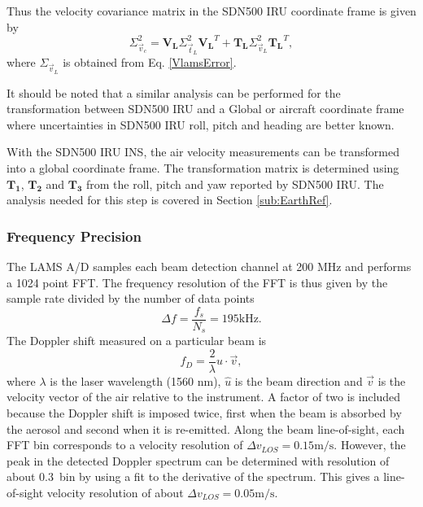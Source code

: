 \documentclass[12pt,twoside,english]{article}\usepackage[]{graphicx}\usepackage[]{color}
\begin{document}
{{Thus the velocity covariance matrix in the SDN500 IRU coordinate frame is given by  
\begin{equation}
\Sigma_{\vec{v}_{c}}^{2}=\mathbf{V_{L}}\Sigma_{\vec{t}_{L}}^{2}\mathbf{V_{L}}^{T}+\mathbf{T_{L}}\Sigma_{\vec{v}_{L}}^{2}\mathbf{T_{L}}^{T},\label{CMvelError} 
\end{equation}
where $\Sigma_{\vec{v}_{L}}$ is obtained from Eq. \eqref{VlamsError}. 

It should be noted that a similar analysis can be performed for the transformation between SDN500 IRU and a Global or aircraft coordinate frame where uncertainties in SDN500 IRU roll, pitch and heading are better known. 


With the SDN500 IRU INS, the air velocity measurements can be transformed into a global coordinate frame. The transformation matrix is determined using $\mathbf{T_{1}}$, $\mathbf{T_{2}}$ and $\mathbf{T_{3}}$ from the roll, pitch and yaw reported by SDN500 IRU. The analysis needed for this step is covered in Section \ref{sub:EarthRef}. 



\subsubsection{Frequency Precision\label{sub:FreqPrec}}

The LAMS A/D samples each beam detection channel at 200 MHz and performs a 1024 point FFT. The frequency resolution of the FFT is thus given by the sample rate divided by the number of data points  
\begin{equation}
\Delta f=\dfrac{f_{s}}{N_{s}}=195\mathrm{kHz}. 
\end{equation}
The Doppler shift measured on a particular beam is  
\begin{equation}
f_{D}=\frac{2}{\lambda}\hat{u}\cdot\vec{v},\label{DopplerShift} 
\end{equation}
where $\lambda$ is the laser wavelength (1560 nm), $\hat{u}$ is the beam direction and $\vec{v}$ is the velocity vector of the air relative to the instrument. A factor of two is included because the Doppler shift is imposed twice, first when the beam is absorbed by the aerosol and second when it is re-emitted. Along the beam line-of-sight, each FFT bin corresponds to a velocity resolution of $\Delta v_{LOS}=0.15\mathrm{m/s}$. 
However, the peak in the detected Doppler spectrum can be determined with resolution of about 0.3~bin by using a fit to the derivative of the spectrum. 
This gives a line-of-sight velocity resolution of about $\Delta v_{LOS}=0.05\mathrm{m/s}$. 

}}
\end{document}

